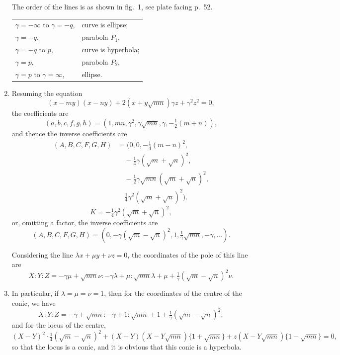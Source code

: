 \documentclass[12pt,a4paper]{article}
\theoremstyle{plain}
\theoremstyle{definition}
\theoremstyle{remark}
\begin{document}
\begin{enumerate}[label=\arabic*.]
The order of the lines is as shown in fig.~1, see plate facing p.~52.

\begin{tabular}{ll}
$\gamma = -\infty$ to $\gamma = -q$, & curve is ellipse; \\
$\gamma = -q$, & parabola $P_1$, \\
$\gamma = -q$ to $p$, & curve is hyperbola; \\
$\gamma = p$, & parabola $P_2$, \\
$\gamma = p$ to $\gamma = \infty$, & ellipse.
\end{tabular}

\item Resuming the equation
\[(x - my)(x - ny) + 2(x + y\sqrt{mn})\gamma z + \gamma^2 z^2 = 0,\]
the coefficients are
\[(a,b,c,f,g,h) = (1, mn, \gamma^2, \gamma\sqrt{mn}, \gamma, -\tfrac{1}{2}(m + n)),\]
and thence the inverse coefficients are
\begin{align*}
(A,B,C,F,G,H) &= (0, 0, -\tfrac{1}{4}(m - n)^2, \\
&\quad -\tfrac{1}{4}\gamma(\sqrt{m} + \sqrt{n})^2, \\
&\quad -\tfrac{1}{2}\gamma\sqrt{mn}(\sqrt{m} + \sqrt{n})^2, \\
&\quad \tfrac{1}{4}\gamma^2(\sqrt{m} + \sqrt{n})^2).
\end{align*}
\[K = -\tfrac{1}{4}\gamma^2(\sqrt{m} + \sqrt{n})^2,\]
or, omitting a factor, the inverse coefficients are
\[(A,B,C,F,G,H) = (0, -\gamma(\sqrt{m} - \sqrt{n})^2, 1, \tfrac{1}{\gamma}\sqrt{mn}, -\gamma, \ldots).\]

Considering the line $\lambda x + \mu y + \nu z = 0$, the coordinates of the pole of this line are
\[X : Y : Z = -\gamma\mu + \sqrt{mn}\nu : -\gamma\lambda + \mu : \sqrt{mn}\lambda + \mu + \tfrac{1}{\gamma}(\sqrt{m} - \sqrt{n})^2\nu.\]

\item In particular, if $\lambda = \mu = \nu = 1$, then for the coordinates of the centre of the conic, we have
\[X : Y : Z = -\gamma + \sqrt{mn} : -\gamma + 1 : \sqrt{mn} + 1 + \tfrac{1}{\gamma}(\sqrt{m} - \sqrt{n})^2;\]
and for the locus of the centre,
\[(X - Y)^2 \cdot \tfrac{1}{4}(\sqrt{m} - \sqrt{n})^2 + (X - Y)(X - Y\sqrt{mn})\{1 + \sqrt{mn}\} + z(X - Y\sqrt{mn})\{1 - \sqrt{mn}\} = 0,\]
so that the locus is a conic, and it is obvious that this conic is a hyperbola.


\end{enumerate}
\end{document}
